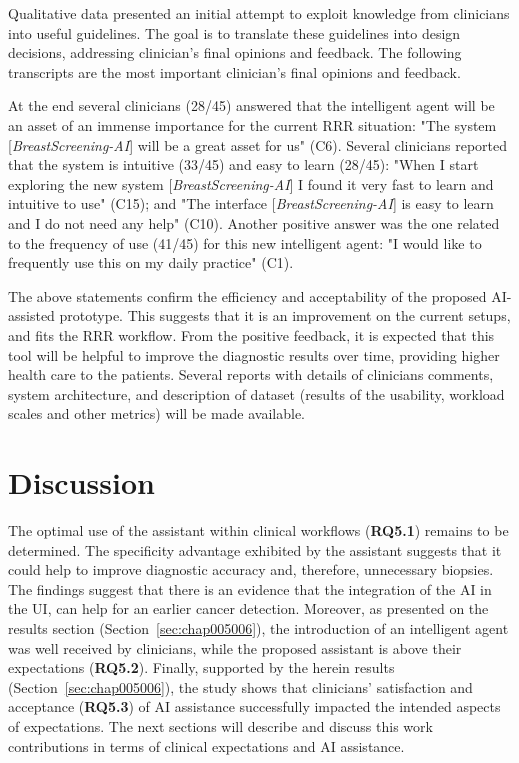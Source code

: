 Qualitative data presented an initial attempt to exploit knowledge from clinicians into useful guidelines.
The goal is to translate these guidelines into design decisions, addressing clinician's final opinions and feedback.
The following transcripts are the most important clinician's final opinions and feedback.

At the end several clinicians (28/45) answered that the intelligent agent will be an asset of an immense importance for the current \ac{RRR} situation:
"The system [{\it BreastScreening-AI}] will be a great asset for us" (C6).
Several clinicians reported that the system is intuitive (33/45) and easy to learn (28/45):
"When I start exploring the new system [{\it BreastScreening-AI}] I found it very fast to learn and intuitive to use" (C15); and
"The interface [{\it BreastScreening-AI}] is easy to learn and I do not need any help" (C10).
Another positive answer was the one related to the frequency of use (41/45) for this new intelligent agent:
"I would like to frequently use this on my daily practice" (C1).

The above statements confirm the efficiency and acceptability of the proposed \ac{AI}-assisted prototype.
This suggests that it is an improvement on the current setups, and fits the \ac{RRR} workflow.
From the positive feedback, it is expected that this tool will be helpful to improve the diagnostic results over time, providing higher health care to the patients.
Several reports with details of clinicians comments, system architecture, and description of dataset (results of the usability, workload scales and other metrics) will be made available.

\section{Discussion}
\label{sec:chap005007}

The optimal use of the assistant within clinical workflows ({\bf RQ5.1}) remains to be determined.
The specificity advantage exhibited by the assistant suggests that it could help to improve diagnostic accuracy and, therefore, unnecessary biopsies.
The findings suggest that there is an evidence that the integration of the \ac{AI} in the \ac{UI}, can help for an earlier cancer detection.
Moreover, as presented on the results section (Section~\ref{sec:chap005006}), the introduction of an intelligent agent was well received by clinicians, while the proposed assistant is above their expectations ({\bf RQ5.2}).
Finally, supported by the herein results (Section~\ref{sec:chap005006}), the study shows that clinicians' satisfaction and acceptance ({\bf RQ5.3}) of \ac{AI} assistance successfully impacted the intended aspects of expectations.
The next sections will describe and discuss this work contributions in terms of clinical expectations and \ac{AI} assistance.

